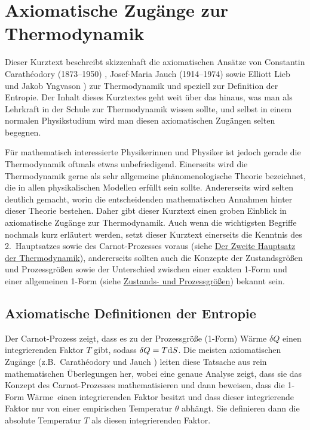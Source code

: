 
\chapter{Axiomatische Zug\"ange zur Thermodynamik}
\label{chap_Entropie_Axiom}

%
Dieser Kurztext beschreibt skizzenhaft die axiomatischen Ans\"atze
von Constantin Carath\'{e}odory (1873--1950) \cite{Caratheodory}, 
Josef-Maria Jauch (1914--1974) \cite{Jauch} 
sowie Elliott Lieb und Jakob Yngvason \cite{Lieb1,Lieb2})
zur Thermodynamik und speziell zur Definition der Entropie. Der Inhalt dieses Kurztextes geht
weit \"uber das hinaus, was man als Lehrkraft in der Schule zur Thermodynamik wissen sollte, und
selbst in einem normalen Physikstudium wird man diesen axiomatischen Zug\"angen selten
begegnen.

F\"ur mathematisch interessierte Physikerinnen und Physiker ist jedoch gerade die Thermodynamik
oftmals etwas unbefriedigend. Einerseits wird die Thermodynamik gerne als sehr allgemeine
ph\"anomenologische Theorie bezeichnet, die in allen physikalischen Modellen erf\"ullt sein sollte.
Andererseits wird selten deutlich gemacht, worin die entscheidenden mathematischen Annahmen
hinter dieser Theorie bestehen. Daher gibt dieser Kurztext einen groben Einblick in axiomatische
Zug\"ange zur Thermodynamik. Auch wenn die wichtigsten Begriffe nochmals kurz erl\"autert
werden, setzt dieser Kurztext einerseits die Kenntnis des 2.\ Hauptsatzes sowie des
Carnot-Prozesses voraus (siehe \glqq \hyperref[chap_ZweiterHS]{Der Zweite Hauptsatz der Thermodynamik})\grqq, 
andererseits sollten auch die Konzepte der Zustandsgr\"o\ss en und
Prozessgr\"o\ss en sowie der Unterschied zwischen einer exakten 1-Form und einer allgemeinen 1-Form
(siehe \glqq \hyperref[chap_Zustand]{Zustands- und Prozessgr\"o\ss en}\grqq) bekannt sein. 
 
\section{Axiomatische Definitionen der Entropie}
\label{sec_AxiomeEntropie}

Der Carnot-Prozess zeigt, dass es zu der Prozessgr\"o\ss e (1-Form) W\"arme $\delta Q$ 
einen integrierenden Faktor $T$ gibt, sodass $\delta Q=T{\rm d}S$. Die meisten axiomatischen Zug\"ange
(z.B.\ Carath\'{e}odory und Jauch \cite{Caratheodory,Jauch}) leiten diese Tatsache aus rein mathematischen
\"Uberlegungen her, wobei eine genaue Analyse zeigt, dass sie das Konzept des Carnot-Prozesses
mathematisieren und dann beweisen, dass die 1-Form \glqq W\"arme\grqq\ einen integrierenden
Faktor besitzt und dass dieser integrierende Faktor nur von einer empirischen Temperatur
$\theta$ abh\"angt. Sie definieren dann die absolute Temperatur $T$ als diesen integrierenden
Faktor. 

